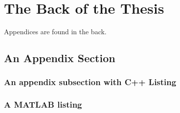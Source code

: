 %
\chapter{The Back of the Thesis}

Appendices are found in the back. 


\section{An Appendix Section}

\subsection{An appendix subsection with C++ Listing}

\lstset{language=C++}


\subsection{A MATLAB listing}

\lstset{language=matlab}

